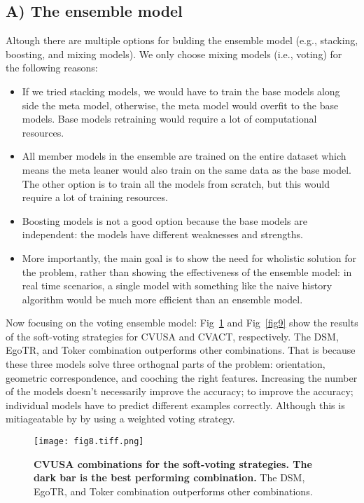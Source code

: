 \documentclass[10pt,letterpaper]{article}
\newif\ifhighlight
\newcommand{\hlb}[1]{\ifhighlight{\hl{#1}}\else{#1}\fi}
\begin{document}
\subsection*{A) The ensemble model}
\hlb{Altough there are multiple options for bulding the ensemble model (e.g., stacking, boosting, and mixing models). We only choose mixing models (i.e., voting) for the following reasons:}
\begin{itemize}
  \item \hlb{If we tried stacking models, we would have to train the base models along side the meta model, otherwise, the meta model would overfit to the base models. Base models retraining would require a lot of computational resources.}
  \item \hlb{All member models in the ensemble are trained on the entire dataset which means the meta leaner would also train on the same data as the base model. The other option is to train all the models from scratch, but this would require a lot of training resources.}
  \item \hlb{Boosting models is not a good option because the base models are independent: the models have different weaknesses and strengths.}
  \item \hlb{More importantly, the main goal is to show the need for wholistic solution for the problem, rather than showing the effectiveness of the ensemble model: in real time scenarios, a single model with something like the naive history algorithm would be much more efficient than an ensemble model.}
\end{itemize}
\hlb{Now focusing on the voting ensemble model: } Fig~\ref{fig8} and Fig~\ref{fig9} show the results of the soft-voting strategies for CVUSA and CVACT, respectively. The DSM, EgoTR, and Toker combination outperforms other combinations. \hlb{That is because these three models solve three orthognal parts of the problem: orientation, geometric correspondence, and cooching the right features.}  Increasing the number of the models doesn’t necessarily improve the accuracy; to improve the accuracy; individual models have to predict different examples correctly. \hlb{Although this is mitiageatable by by using a weighted voting strategy.}

\begin{figure}[!ht]
  \caption{{\bf CVUSA combinations for the soft-voting strategies. The dark bar is the best performing combination.} The DSM, EgoTR, and Toker combination outperforms other combinations.}
  \texttt{[image: fig8.tiff.png]}
  
  \label{fig8}
\end{figure}
\end{document}
